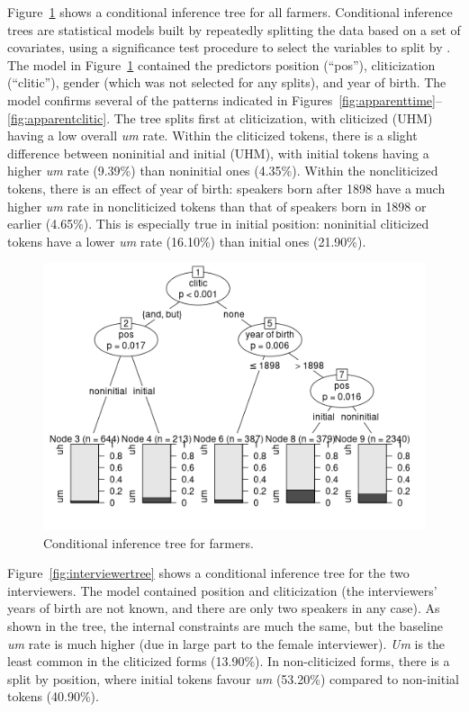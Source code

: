\documentclass[11pt]{article}
\begin{document}
Figure~\ref{fig:farmertree} shows a conditional inference tree for all farmers.
Conditional inference trees are statistical models built by repeatedly splitting
the data based on a set of covariates, using a significance test procedure to
select the variables to split by \parencite{tagliamontebaayen2012}.
The model in Figure~\ref{fig:farmertree} contained the predictors position
(``pos''), cliticization (``clitic''), gender (which was not selected for any
splits), and year of birth.
The model confirms several of the patterns indicated in
Figures~\ref{fig:apparenttime}--\ref{fig:apparentclitic}.
The tree splits first at cliticization, with cliticized (UHM) having a low
overall \emph{um} rate.
Within the cliticized tokens, there is a slight difference between noninitial
and initial (UHM), with initial tokens having a higher \emph{um} rate (9.39\%)
than noninitial ones (4.35\%).
Within the noncliticized tokens, there is an effect of year of birth:
speakers born after 1898 have a much higher \emph{um} rate in noncliticized
tokens than that of speakers born in 1898 or earlier (4.65\%).
This is especially true in initial position:
noninitial cliticized tokens have a lower \emph{um} rate (16.10\%) than initial
ones (21.90\%).

\begin{figure}[htpb]
    \centering
    \includegraphics[width=0.8\linewidth]{figures/ctreefarmers.png}
    \caption{Conditional inference tree for farmers.}
    \label{fig:farmertree}
\end{figure}

Figure~\ref{fig:interviewertree} shows a conditional inference tree for the two
interviewers.
The model contained position and cliticization (the interviewers' years of birth
are not known, and there are only two speakers in any case).
As shown in the tree, the internal constraints are much the same, but the
baseline \emph{um} rate is much higher (due in large part to the female
interviewer).
\emph{Um} is the least common in the cliticized forms (13.90\%).
In non-cliticized forms, there is a split by position, where initial tokens
favour \emph{um} (53.20\%) compared to non-initial tokens (40.90\%).
\end{document}
